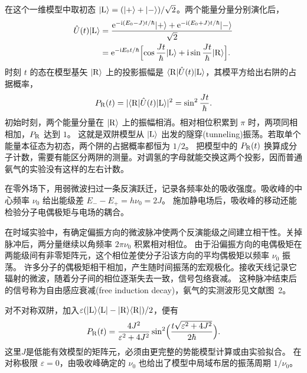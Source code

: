在这个一维模型中取初态 $\lvert\mathrm{L}\rangle = (\lvert+\rangle + \lvert-\rangle)/\sqrt2$。两个能量分量分别演化后，
\begin{equation}
    \begin{alignedat}{1}
        \hat{U}(t)\lvert\mathrm{L}\rangle &= \frac{\mathop{}\!\mathrm{e}^{-\mathrm{i}(E_0-J)t/\hbar}\lvert+\rangle
            + \mathop{}\!\mathrm{e}^{-\mathrm{i}(E_0+J)t/\hbar}\lvert-\rangle}{\sqrt2}\\
        &= \mathop{}\!\mathrm{e}^{-\mathrm{i} E_0t/\hbar}
            \Bigl[\cos\frac{Jt}{\hbar}\lvert\mathrm{L}\rangle
            + \mathrm{i}\sin\frac{Jt}{\hbar}\lvert\mathrm{R}\rangle\Bigr].
    \end{alignedat}
\end{equation}
时刻 $t$ 的态在模型基矢 $\lvert\mathrm{R}\rangle$ 上的投影振幅是 $\langle\mathrm{R}\vert\hat{U}(t)\vert\mathrm{L}\rangle$，其模平方给出右阱的占据概率，
\begin{equation}
    P_{\mathrm{R}}(t) = \lvert\langle\mathrm{R}\vert\hat{U}(t)\vert\mathrm{L}\rangle\rvert^2 = \sin^2\frac{Jt}{\hbar}.
\end{equation}
初始时刻，两个能量分量在 $\lvert\mathrm{R}\rangle$ 上的振幅相消。相对相位积累到 $\pi$ 时，两项同相相加，$P_{\mathrm{R}}$ 达到 $1$。
这就是双阱模型从 $\lvert\mathrm{L}\rangle$ 出发的隧穿(tunneling)振荡。若取单个能量本征态为初态，两个阱的占据概率都恒为 $1/2$。
把模型中的 $P_{\mathrm{R}}(t)$ 换算成分子计数，需要有能区分两阱的测量。对调氢的字母就能交换这两个投影，因而普通氨气的实验没有这样的左右计数。

在零外场下，用弱微波扫过一条反演跃迁，记录各频率处的吸收强度。吸收峰的中心频率 $\nu_0$ 给出能级差 $E_- - E_+ = h\nu_0 = 2J$。
施加静电场后，吸收峰的移动还能检验分子电偶极矩与电场的耦合\cite{feynman9}。

在时域实验中，有确定偏振方向的微波脉冲使两个反演能级之间建立相干性。关掉脉冲后，两分量继续以角频率 $2\pi\nu_0$ 积累相对相位。
由于沿偏振方向的电偶极矩在两能级间有非零矩阵元，这个相位差使分子沿该方向的平均偶极矩以频率 $\nu_0$ 振荡。
许多分子的偶极矩相干相加，产生随时间振荡的宏观极化。接收天线记录它辐射的微波，随着分子间的相位逐渐失去一致，信号包络衰减。
这种脉冲结束后的信号称为自由感应衰减(free induction decay)，氨气的实测波形见文献\cite{ammonia-fid}图~2。

对不对称双阱，加入$\varepsilon(\lvert\mathrm{L}\rangle\langle\mathrm{L}\rvert - \lvert\mathrm{R}\rangle\langle\mathrm{R}\rvert)/2$，便有
\begin{equation}
    P_{\mathrm{R}}(t) = \frac{4J^2}{\varepsilon^2 + 4J^2}
    \sin^2\Bigl(\frac{t\sqrt{\varepsilon^2 + 4J^2}}{2\hbar}\Bigr).
\end{equation}
这里$J$是低能有效模型的矩阵元，必须由更完整的势能模型计算或由实验拟合。
在对称极限 $\varepsilon = 0$，由吸收峰确定的 $\nu_0$ 也给出了模型中局域布居的振荡周期 $1/\nu_0$。

